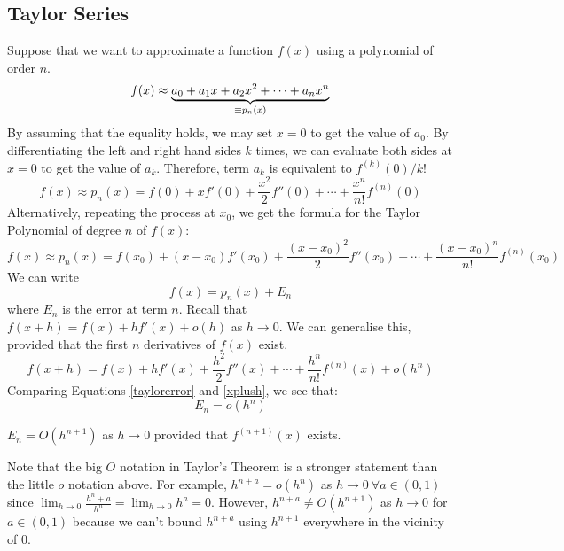 \subsection{Taylor Series}
Suppose that we want to approximate a function \(f(x)\) using a polynomial of order \(n\).
\[
	f(x) \approx \underbrace{a_0 + a_1 x + a_2 x^2 + \cdots + a_n x^n}_{\mathclap{\equiv p_n(x)}}
\]
By assuming that the equality holds, we may set \(x=0\) to get the value of \(a_0\).
By differentiating the left and right hand sides \(k\) times, we can evaluate both sides at \(x=0\) to get the value of \(a_k\).
Therefore, term \(a_k\) is equivalent to \(f^{(k)}(0)/k!
\)
\[
	f(x) \approx p_n(x) = f(0) + xf'(0) + \frac{x^2}{2}f''(0) + \cdots + \frac{x^n}{n!}f^{(n)}(0)
\]
Alternatively, repeating the process at \(x_0\), we get the formula for the Taylor Polynomial of degree \(n\) of \(f(x)\):
\[
	f(x) \approx p_n(x) = f(x_0) + (x-x_0)f'(x_0) + \frac{(x-x_0)^2}{2}f''(x_0) + \cdots + \frac{(x-x_0)^n}{n!}f^{(n)}(x_0)
\]
We can write
\begin{equation}\label{taylorerror}
	f(x) = p_n(x) + E_n
\end{equation}
where \(E_n\) is the error at term \(n\).
Recall that \(f(x+h) = f(x) + hf'(x) + o(h)\) as \(h \to 0\).
We can generalise this, provided that the first \(n\) derivatives of \(f(x)\) exist.
\begin{equation}\label{xplush}
	f(x+h) = f(x) + hf'(x) + \frac{h^2}{2}f''(x) + \cdots + \frac{h^n}{n!}f^{(n)}(x) + o(h^n)
\end{equation}
Comparing Equations \eqref{taylorerror} and \eqref{xplush}, we see that:
\[
	E_n = o(h^n)
\]
\begin{theorem}
	\(E_n = O(h^{n+1})\) as \(h \to 0\) provided that \(f^{(n+1)}(x)\) exists.
\end{theorem}
Note that the big \(O\) notation in Taylor's Theorem is a stronger statement than the little \(o\) notation above.
For example, \(h^{n+a}=o(h^n)\) as \(h \to 0\ \forall a \in (0, 1)\) since \(\lim_{h\to 0} \frac{h^n+a}{h^n} = \lim_{h\to 0} h^a = 0\).
However, \(h^{n+a} \neq O(h^{n+1})\) as \(h \to 0\) for \(a \in (0, 1)\) because we can't bound \(h^{n+a}\) using \(h^{n+1}\) everywhere in the vicinity of \(0\).


